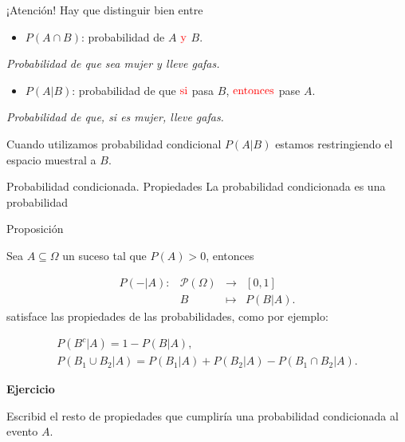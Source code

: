 \documentclass[
  ignorenonframetext,
]{beamer}
\providecommand{\tightlist}{%
  \setlength{\itemsep}{0pt}\setlength{\parskip}{0pt}}
\begin{document}
\begin{frame}{¡Atención!}
\protect\hypertarget{atenciuxf3n}{}
Hay que distinguir bien entre

\begin{itemize}
\tightlist
\item
  \(P(A\cap B)\): probabilidad de \(A\) \(\color{red}{\text{y}}\) \(B\).
\end{itemize}

\emph{Probabilidad de que sea mujer y lleve gafas.}

\begin{itemize}
\tightlist
\item
  \(P(A|B)\): probabilidad de que \(\color{red}{\text{si}}\) pasa \(B\),
  \(\color{red}{\text{entonces}}\) pase \(A\).
\end{itemize}

\emph{Probabilidad de que, si es mujer, lleve gafas.}

Cuando utilizamos probabilidad condicional \(P(A|B)\) estamos
restringiendo el espacio muestral a \(B\).
\end{frame}

\begin{frame}{Probabilidad condicionada. Propiedades}
\protect\hypertarget{probabilidad-condicionada.-propiedades}{}
La probabilidad condicionada es una probabilidad

Proposición

Sea \(A\subseteq \Omega\) un suceso tal que \(P(A)>0\), entonces

\[
\begin{array}{rccl}
P(-|A):& \mathcal{P}(\Omega) & \to & [0,1]\\
&B & \mapsto & P(B|A).
\end{array}
\] satisface las propiedades de las probabilidades, como por ejemplo:

\[
\begin{array}{l}
P(B^c|A)=1-P(B|A),\\
P(B_1\cup B_2|A)=P(B_1|A)+P(B_2|A)-P(B_1\cap B_2|A).
\end{array}
\]

\textbf{Ejercicio}

Escribid el resto de propiedades que cumpliría una probabilidad
condicionada al evento \(A\).
\end{frame}
\end{document}
